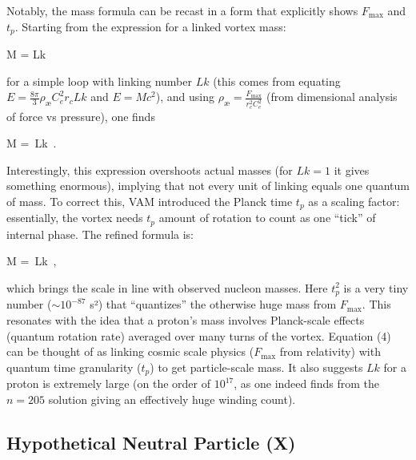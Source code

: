 Notably, the mass formula can be recast in a form that explicitly shows $F_{\text{max}}$ and $t_p$. Starting from the expression for a linked vortex mass:

M =  Lk 

for a simple loop with linking number $Lk$ (this comes from equating $E=\frac{8\pi}{3}\rho_{æ}C_e^2 r_c Lk$ and $E=Mc^2$), and using $\rho_{æ} = \frac{F_{\text{max}}}{r_c^2 C_e^2}$ (from dimensional analysis of force vs pressure), one finds

M = \,Lk~. 

Interestingly, this expression overshoots actual masses (for $Lk=1$ it gives something enormous), implying that not every unit of linking equals one quantum of mass. To correct this, VAM introduced the Planck time $t_p$ as a scaling factor: essentially, the vortex needs $t_p$ amount of rotation to count as one “tick” of internal phase. The refined formula is:

M \;=\; \,Lk~, 

which brings the scale in line with observed nucleon masses. Here $t_p^2$ is a very tiny number ($\sim10^{-87}$ s²) that “quantizes” the otherwise huge mass from $F_{\text{max}}$. This resonates with the idea that a proton’s mass involves Planck-scale effects (quantum rotation rate) averaged over many turns of the vortex. Equation (4) can be thought of as linking cosmic scale physics ($F_{\text{max}}$ from relativity) with quantum time granularity ($t_p$) to get particle-scale mass. It also suggests $Lk$ for a proton is extremely large (on the order of $10^{17}$, as one indeed finds from the $n=205$ solution giving an effectively huge winding count).


\subsection*{Hypothetical Neutral Particle (X)}

